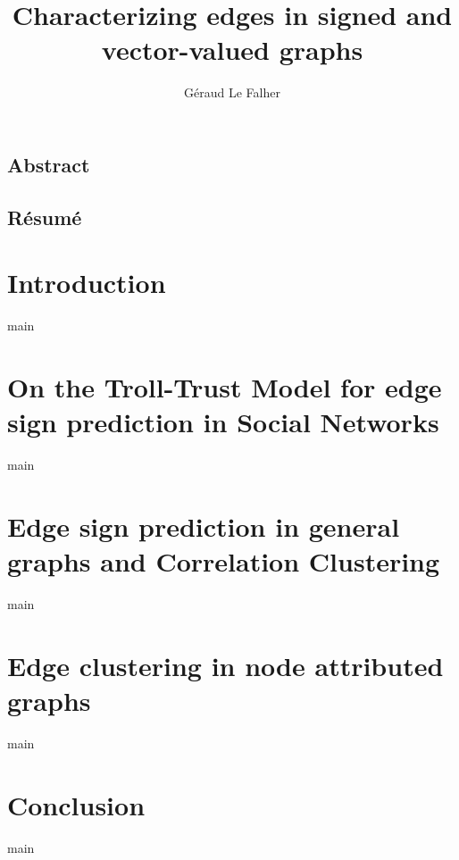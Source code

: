 \documentclass[a4paper,svgnames,twoside,onecolumn,final,titlepage,11pt]{report}
\title{Characterizing edges in signed and vector-valued graphs}
\author{Géraud Le Falher}
\begin{document}

\maketitle

\section*{Abstract}


\begin{otherlanguage}{french}
  \section*{Résumé}
  
\end{otherlanguage}

\tableofcontents
\newpage



\chapter{Introduction}
{main}

\chapter{On the Troll-Trust Model for edge sign prediction in Social Networks}
{main}

\chapter{Edge sign prediction in general graphs and Correlation Clustering}
{main}

\chapter{Edge clustering in node attributed graphs}
{main}

\chapter{Conclusion}
{main}

\vspace{\baselineskip}
\begingroup
{}
\setlength\bibitemsep{1pt}
\todos
\printbibliography
\restoregeometry
\endgroup
\end{document}
